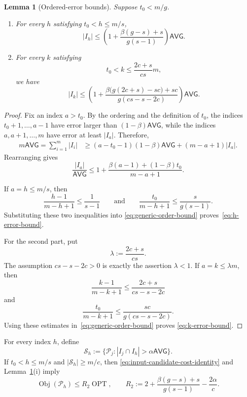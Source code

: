 \documentclass[11pt]{article}
\newtheorem{lemma}[theorem]{Lemma}
\theoremstyle{definition}
\theoremstyle{remark}
\newcommand{\Pp}{\mathcal P}
\newcommand{\Sset}{\mathcal S}
\newcommand{\OPT}{\operatorname{OPT}}
\newcommand{\Obj}{\operatorname{Obj}}
\newcommand{\1}{\mathbf 1}
\begin{document}
\begin{lemma}[Ordered-error bounds]\label{lem:ordered-error-bounds}
Suppose $t_0<m/g$.
\begin{enumerate}[label=(\roman*),leftmargin=2.5em]
\item For every $h$ satisfying $t_0<h\le m/s$,
\begin{equation}\label{eq:h-error-bound}
 |I_h|
 \le
 \left(
  1+\frac{\beta(g-s)+s}{g(s-1)}
 \right)\mathsf{AVG}.
\end{equation}
\item For every $k$ satisfying
\[
 t_0<k\le\frac{2c+s}{cs}m,
\]
we have
\begin{equation}\label{eq:k-error-bound}
 |I_k|
 \le
 \left(
 1+
 \frac{\beta\bigl(g(2c+s)-sc\bigr)+sc}
      {g(cs-s-2c)}
 \right)\mathsf{AVG}.
\end{equation}
\end{enumerate}
\end{lemma}

\begin{proof}
Fix an index $a>t_0$.  By the ordering and the definition of $t_0$,
the indices $t_0+1,\ldots,a-1$ have error larger than
$(1-\beta)\mathsf{AVG}$, while the indices $a,a+1,\ldots,m$ have error at
least $|I_a|$.  Therefore,
\begin{align*}
 m\mathsf{AVG}
 =\sum_{i=1}^m|I_i|
 &\ge
 (a-t_0-1)(1-\beta)\mathsf{AVG}
 +(m-a+1)|I_a|.
\end{align*}
Rearranging gives
\begin{equation}\label{eq:generic-order-bound}
 \frac{|I_a|}{\mathsf{AVG}}
 \le
 1+
 \frac{\beta(a-1)+(1-\beta)t_0}{m-a+1}.
\end{equation}

If $a=h\le m/s$, then
\[
 \frac{h-1}{m-h+1}\le\frac1{s-1}
 \qquad\text{and}\qquad
 \frac{t_0}{m-h+1}\le\frac{s}{g(s-1)}.
\]
Substituting these two inequalities into
\eqref{eq:generic-order-bound} proves~\eqref{eq:h-error-bound}.

For the second part, put
\[
 \lambda:=\frac{2c+s}{cs}.
\]
The assumption $cs-s-2c>0$ is exactly the assertion $\lambda<1$.
If $a=k\le\lambda m$, then
\[
 \frac{k-1}{m-k+1}
 \le\frac{2c+s}{cs-s-2c}
\]
and
\[
 \frac{t_0}{m-k+1}
 \le\frac{sc}{g(cs-s-2c)}.
\]
Using these estimates in~\eqref{eq:generic-order-bound} proves
\eqref{eq:k-error-bound}.
\end{proof}

For every index $h$, define
\begin{equation}\label{eq:S-h-definition}
 \Sset_h
 :=\{\Pp_j:|I_j\cap I_h|>\alpha\mathsf{AVG}\}.
\end{equation}
If $t_0<h\le m/s$ and $|\Sset_h|\ge m/c$, then
\eqref{eq:input-candidate-cost-identity} and
Lemma~\ref{lem:ordered-error-bounds}(i) imply
\begin{equation}\label{eq:R2-bound}
 \Obj(\Pp_h)
 \le R_2\OPT,
 \qquad
 R_2
 :=
 2+\frac{\beta(g-s)+s}{g(s-1)}-\frac{2\alpha}{c}.
\end{equation}
\end{document}
